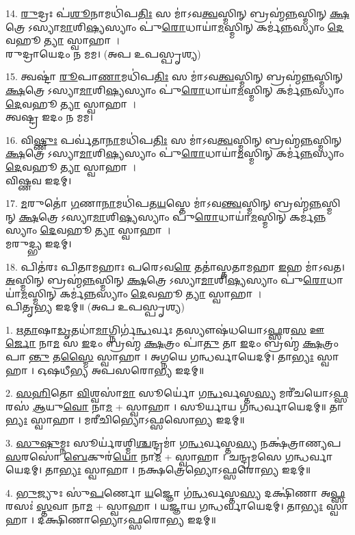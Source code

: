 14. \ul{𑌰𑍁}𑌦𑍍𑌰𑌃 𑌪॑\ul{𑌶𑍂}𑌨𑌾𑌮𑌧𑌿॑𑌪\ul{𑌤𑌿𑌃} 𑌸 𑌮𑌾॑𑌽𑌵\ul{𑌤𑍍𑌵}𑌸𑍍𑌮𑌿𑌨𑍍 𑌬𑍍𑌰𑌹𑍍𑌮॑\ul{𑌨𑍍𑌨}𑌸𑍍𑌮𑌿𑌨𑍍 \ul{𑌕𑍍𑌷}𑌤𑍍𑌰𑍇𑌽𑌸𑍍𑌯𑌾\ul{𑌮𑌾}𑌶𑌿\ul{𑌷𑍍𑌯}𑌸𑍍𑌯𑌾𑌂 𑌪𑍁॑\ul{𑌰𑍋}𑌧𑌾𑌯𑌾॑\ul{𑌮}𑌸𑍍𑌮𑌿𑌨𑍍 𑌕𑌰𑍍𑌮॑\ul{𑌨𑍍𑌨}𑌸𑍍𑌯𑌾𑌂 \ul{𑌦𑍇}𑌵𑌹𑍂\ul{𑌤𑍍𑌯𑌾} 𑌸𑍍𑌵𑌾𑌹𑌾।\\
𑌰𑍁𑌦𑍍𑌰𑌾𑌯𑍇𑌦𑌂 𑌨 𑌮𑌮। (𑌅𑌪 𑌉𑌪𑌸𑍍𑌪𑍃𑌶𑍍𑌯)

15. 𑌤𑍍𑌵𑌷𑍍𑌟𑌾॑ \ul{𑌰𑍂}𑌪𑌾\ul{𑌣𑌾}𑌮𑌧𑌿॑𑌪\ul{𑌤𑌿𑌃} 𑌸 𑌮𑌾॑𑌽𑌵\ul{𑌤𑍍𑌵}𑌸𑍍𑌮𑌿𑌨𑍍 𑌬𑍍𑌰𑌹𑍍𑌮॑\ul{𑌨𑍍𑌨}𑌸𑍍𑌮𑌿𑌨𑍍 \ul{𑌕𑍍𑌷}𑌤𑍍𑌰𑍇𑌽𑌸𑍍𑌯𑌾\ul{𑌮𑌾}𑌶𑌿\ul{𑌷𑍍𑌯}𑌸𑍍𑌯𑌾𑌂 𑌪𑍁॑\ul{𑌰𑍋}𑌧𑌾𑌯𑌾॑\ul{𑌮}𑌸𑍍𑌮𑌿𑌨𑍍 𑌕𑌰𑍍𑌮॑\ul{𑌨𑍍𑌨}𑌸𑍍𑌯𑌾𑌂 \ul{𑌦𑍇}𑌵𑌹𑍂\ul{𑌤𑍍𑌯𑌾} 𑌸𑍍𑌵𑌾𑌹𑌾।\\
𑌤𑍍𑌵𑌷𑍍𑌟𑍍𑌰 𑌇𑌦𑌂 𑌨 𑌮𑌮।

16. 𑌵𑌿\ul{𑌷𑍍𑌣𑍁𑌃} 𑌪𑌰𑍍𑌵॑𑌤𑌾\ul{𑌨𑌾}𑌮𑌧𑌿॑𑌪\ul{𑌤𑌿𑌃} 𑌸 𑌮𑌾॑𑌽𑌵\ul{𑌤𑍍𑌵}𑌸𑍍𑌮𑌿𑌨𑍍 𑌬𑍍𑌰𑌹𑍍𑌮॑\ul{𑌨𑍍𑌨}𑌸𑍍𑌮𑌿𑌨𑍍 \ul{𑌕𑍍𑌷}𑌤𑍍𑌰𑍇𑌽𑌸𑍍𑌯𑌾\ul{𑌮𑌾}𑌶𑌿\ul{𑌷𑍍𑌯}𑌸𑍍𑌯𑌾𑌂 𑌪𑍁॑\ul{𑌰𑍋}𑌧𑌾𑌯𑌾॑\ul{𑌮}𑌸𑍍𑌮𑌿𑌨𑍍 𑌕𑌰𑍍𑌮॑\ul{𑌨𑍍𑌨}𑌸𑍍𑌯𑌾𑌂 \ul{𑌦𑍇}𑌵𑌹𑍂\ul{𑌤𑍍𑌯𑌾} 𑌸𑍍𑌵𑌾𑌹𑌾।\\
𑌵𑌿𑌷𑍍𑌣𑌵 𑌇𑌦𑌮𑍍।

17. \ul{𑌮}𑌰𑍁𑌤𑍋॑ \ul{𑌗}𑌣𑌾\ul{𑌨𑌾}𑌮𑌧𑌿॑𑌪𑌤\ul{𑌯}𑌸𑍍𑌤𑍇 𑌮𑌾॑𑌽𑌵\ul{𑌨𑍍𑌤𑍍𑌵}𑌸𑍍𑌮𑌿𑌨𑍍 𑌬𑍍𑌰𑌹𑍍𑌮॑\ul{𑌨𑍍𑌨}𑌸𑍍𑌮𑌿𑌨𑍍 \ul{𑌕𑍍𑌷}𑌤𑍍𑌰𑍇𑌽𑌸𑍍𑌯𑌾\ul{𑌮𑌾}𑌶𑌿\ul{𑌷𑍍𑌯}𑌸𑍍𑌯𑌾𑌂 𑌪𑍁॑\ul{𑌰𑍋}𑌧𑌾𑌯𑌾॑\ul{𑌮}𑌸𑍍𑌮𑌿𑌨𑍍 𑌕𑌰𑍍𑌮॑\ul{𑌨𑍍𑌨}𑌸𑍍𑌯𑌾𑌂 \ul{𑌦𑍇}𑌵𑌹𑍂\ul{𑌤𑍍𑌯𑌾} 𑌸𑍍𑌵𑌾𑌹𑌾।\\
𑌮𑌰𑍁𑌦𑍍𑌭𑍍𑌯 𑌇𑌦𑌮𑍍।

18. 𑌪𑌿𑌤॑𑌰𑌃 𑌪𑌿𑌤𑌾𑌮𑌹𑌾𑌃 𑌪𑌰𑍇𑌽𑌵\ul{𑌰𑍇} 𑌤𑌤𑌾॑॑𑌸𑍍𑌤𑌤𑌾𑌮𑌹𑌾 \ul{𑌇}𑌹 𑌮𑌾॑𑌽𑌵𑌤। \ul{𑌅}𑌸𑍍𑌮𑌿𑌨𑍍 𑌬𑍍𑌰𑌹𑍍𑌮॑\ul{𑌨𑍍𑌨}𑌸𑍍𑌮𑌿𑌨𑍍 \ul{𑌕𑍍𑌷}𑌤𑍍𑌰𑍇𑌽𑌸𑍍𑌯𑌾\ul{𑌮𑌾}𑌶𑌿\ul{𑌷𑍍𑌯}𑌸𑍍𑌯𑌾𑌂 𑌪𑍁॑\ul{𑌰𑍋}𑌧𑌾𑌯𑌾॑\ul{𑌮}𑌸𑍍𑌮𑌿𑌨𑍍 𑌕𑌰𑍍𑌮॑\ul{𑌨𑍍𑌨}𑌸𑍍𑌯𑌾𑌂 \ul{𑌦𑍇}𑌵𑌹𑍂\ul{𑌤𑍍𑌯𑌾} 𑌸𑍍𑌵𑌾𑌹𑌾।\\
𑌪𑌿𑌤𑍃𑌭𑍍𑌯 𑌇𑌦𑌮𑍍॥ (𑌅𑌪 𑌉𑌪𑌸𑍍𑌪𑍃𑌶𑍍𑌯)


1. \ul{𑌋}\ul{𑌤𑌾}𑌷𑌾\ul{𑌡𑍃}𑌤𑌧𑌾॑\ul{𑌮𑌾}𑌗𑍍𑌨𑌿𑌰𑍍𑌗॑\ul{𑌨𑍍𑌧}𑌰𑍍𑌵𑌃 𑌤𑌸𑍍𑌯𑍗𑌷॑𑌧𑌯𑍋𑌽\ul{𑌫𑍍𑌸}𑌰\ul{𑌸} 𑌊\ul{𑌰𑍍𑌜𑍋} 𑌨𑌾\ul{𑌮}
𑌸 \ul{𑌇}𑌦𑌂 𑌬𑍍𑌰𑌹𑍍𑌮॑ \ul{𑌕𑍍𑌷}𑌤𑍍𑌰𑌂 𑌪𑌾॑\ul{𑌤𑍁} 𑌤𑌾 \ul{𑌇}𑌦𑌂 𑌬𑍍𑌰𑌹𑍍𑌮॑ \ul{𑌕𑍍𑌷}𑌤𑍍𑌰𑌂 𑌪𑌾\ul{𑌨𑍍𑌤𑍁} 𑌤\ul{𑌸𑍍𑌮𑍈} 𑌸𑍍𑌵𑌾𑌹𑌾। 
𑌅𑌗𑍍𑌨𑌯𑍇 𑌗𑌨𑍍𑌧𑌰𑍍𑌵𑌾𑌯𑍇𑌦𑌮𑍍। 𑌤𑌾\ul{𑌭𑍍𑌯𑌃} 𑌸𑍍𑌵𑌾𑌹𑌾। 𑌓𑌷𑌧𑍀𑌭𑍍𑌯 𑌅𑌪𑌸𑌰𑍋𑌭𑍍𑌯 𑌇𑌦𑌮𑍍॥

2. \ul{𑌸}\ul{𑌹𑌿}𑌤𑍋 \ul{𑌵𑌿}𑌶𑍍𑌵𑌸𑌾॑\ul{𑌮𑌾} 𑌸𑍂𑌰𑍍𑌯𑍋॑ 𑌗\ul{𑌨𑍍𑌧}𑌰𑍍𑌵𑌸𑍍𑌤\ul{𑌸𑍍𑌯} 𑌮𑌰𑍀॑𑌚𑌯𑍋𑌽\ul{𑌫𑍍𑌸}𑌰𑌸॑ \ul{𑌆}𑌯𑍁\ul{𑌵𑍋} 𑌨𑌾\ul{𑌮} + 𑌸𑍍𑌵𑌾𑌹𑌾।
𑌸𑍂𑌰𑍍𑌯𑌾𑌯 𑌗𑌨𑍍𑌧𑌰𑍍𑌵𑌾𑌯𑍇𑌦𑌮𑍍॥ 𑌤𑌾\ul{𑌭𑍍𑌯𑌃} 𑌸𑍍𑌵𑌾𑌹𑌾। 𑌮𑌰𑍀𑌚𑌿𑌭𑍍𑌯𑍋𑌽𑌫𑍍𑌸𑌸𑍋𑌭𑍍𑌯 𑌇𑌦𑌮𑍍॥

3. \ul{𑌸𑍁}\ul{𑌷𑍁}𑌮𑍍𑌨𑌃 𑌸𑍂𑌰𑍍𑌯॑𑌰𑌶𑍍𑌮𑌿\ul{𑌶𑍍𑌚}𑌨𑍍𑌦𑍍𑌰𑌮𑌾॑ 𑌗\ul{𑌨𑍍𑌧}𑌰𑍍𑌵𑌸𑍍𑌤\ul{𑌸𑍍𑌯} 𑌨𑌕𑍍𑌷॑𑌤𑍍𑌰𑌾𑌣𑍍𑌯𑌪\ul{𑌸}𑌰𑌸𑍋॑ \ul{𑌬𑍇}𑌕𑍁𑌰॑\ul{𑌯𑍋} 𑌨𑌾\ul{𑌮} + 𑌸𑍍𑌵𑌾𑌹𑌾।
𑌚𑌨𑍍𑌦𑍍𑌰𑌮𑌸𑍇 𑌗𑌨𑍍𑌧𑌰𑍍𑌵𑌾𑌯𑍇𑌦𑌮𑍍। 𑌤𑌾\ul{𑌭𑍍𑌯𑌃} 𑌸𑍍𑌵𑌾𑌹𑌾। 𑌨𑌕𑍍𑌷𑌤𑍍𑌰𑍇𑌭𑍍𑌯𑍋𑌽𑌫𑍍𑌸𑌰𑍋𑌭𑍍𑌯 𑌇𑌦𑌮𑍍॥

4. \ul{𑌭𑍁}𑌜𑍍𑌯𑍁𑌃 𑌸𑍁॑\ul{𑌪}𑌰𑍍𑌣𑍋 \ul{𑌯}𑌜𑍍𑌞𑍋 𑌗॑\ul{𑌨𑍍𑌧}𑌰𑍍𑌵𑌸𑍍𑌤\ul{𑌸𑍍𑌯} 𑌦𑌕𑍍𑌷𑌿॑𑌣𑌾 𑌅\ul{𑌫𑍍𑌸}𑌰𑌸𑌃॑ \ul{𑌸𑍍𑌤}𑌵𑌾 𑌨𑌾\ul{𑌮} + 𑌸𑍍𑌵𑌾𑌹𑌾।
𑌯𑌜𑍍𑌞𑌾𑌯 𑌗𑌨𑍍𑌧𑌰𑍍𑌵𑌾𑌯𑍇𑌦𑌮𑍍। 𑌤𑌾\ul{𑌭𑍍𑌯𑌃} 𑌸𑍍𑌵𑌾𑌹𑌾। 𑌦𑌕𑍍𑌷𑌿𑌣𑌾𑌭𑍍𑌯𑍋𑌽𑌫𑍍𑌸𑌰𑍋𑌭𑍍𑌯 𑌇𑌦𑌮𑍍॥

